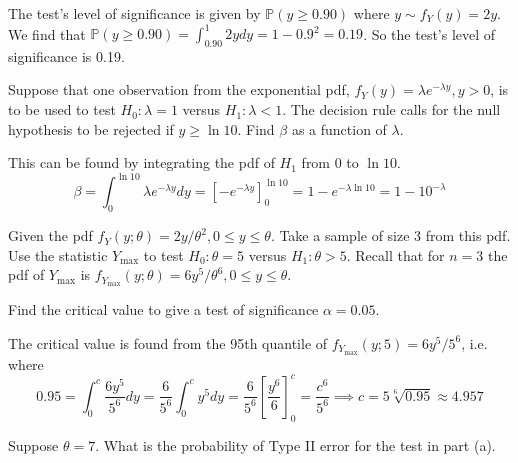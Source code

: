 \documentclass{article}
\renewcommand{\P}{\mathbb{P}}
\begin{document}
\begin{probset}
\begin{prob}[\textbf{6.4.14}]
    \begin{soln}
        The test's level of significance is given by $\P(y \geq 0.90)$ where $y \sim f_Y(y) = 2y$. We find that $\P(y \geq 0.90) = \int_{0.90}^1 2y dy = 1 - 0.9^2 = 0.19$. So the test's level of significance is 0.19.
    \end{soln}
\end{prob}

\begin{prob}[\textbf{6.4.20}]
    Suppose that one observation from the exponential pdf, $f_Y(y) = \lambda e^{-\lambda y}, y > 0$, is to be used to test $H_0: \lambda = 1$ versus $H_1: \lambda < 1$. The decision rule calls for the null hypothesis to be rejected if $y \geq \ln 10$. Find $\beta$ as a function of $\lambda$.

    \begin{soln}
        This can be found by integrating the pdf of $H_1$ from 0 to $\ln 10$.
        \[
            \beta = \int_{0}^{\ln 10} \lambda e^{-\lambda y} dy = \left[ -e^{-\lambda y} \right]_{0}^{\ln 10} = 1 - e^{-\lambda \ln 10} = 1 - 10^{-\lambda}
        \]
    \end{soln}
\end{prob}

\newpage

\begin{prob}[\textbf{6.4.24}]
    Given the pdf $f_Y(y; \theta) = 2y/\theta^2, 0 \leq y \leq \theta$. Take a sample of size 3 from this pdf. Use the statistic $Y_{\max}$ to test $H_0: \theta = 5$ versus $H_1: \theta > 5$. Recall that for $n = 3$ the pdf of $Y_{\max}$ is $f_{Y_{\max}}(y; \theta) = 6y^5/\theta^6, 0 \leq y \leq \theta$.

    \begin{subprobset}
    \begin{subprob}
        Find the critical value to give a test of significance $\alpha = 0.05$.

        \begin{soln}
            The critical value is found from the 95th quantile of $f_{Y_{\max}}(y; 5) = 6y^5/5^6$, i.e. where
            \[
                0.95 = \int_0^c \frac{6y^5}{5^6} dy = \frac{6}{5^6} \int_0^c y^5 dy = \frac{6}{5^6} \left[\frac{y^6}{6}\right]_0^c = \frac{c^6}{5^6} \implies c = 5\sqrt[6]{0.95} \approx 4.957
            \]
        \end{soln}
    \end{subprob}

    \begin{subprob}
        Suppose $\theta = 7$. What is the probability of Type II error for the test in part (a).


\end{subprob}
\end{subprobset}
\end{prob}
\end{probset}
\end{document}
